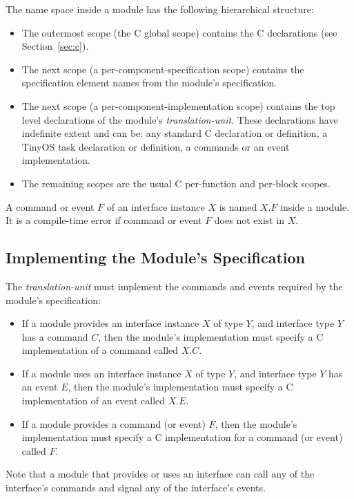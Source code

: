 \documentclass[11pt]{article}
\begin{document}
The name space inside a module has the following hierarchical structure:
\begin{itemize}
\item The outermost scope (the C global scope) contains the C declarations
(see Section~\ref{sec:c}).
\item The next scope (a per-component-specification scope) contains the
specification element names from the module's specification.
\item The next scope (a per-component-implementation scope) contains the
top level declarations of the module's \emph{translation-unit}. These
declarations have indefinite extent and can be: any standard C declaration
or definition, a TinyOS task declaration or definition, a commands or an
event implementation.


\item The remaining scopes are the usual C per-function and per-block scopes.
\end{itemize}

A command or event $F$ of an interface instance $X$ is named $X.F$ inside a
module. It is a compile-time error if command or event $F$ does not 
exist in $X$.

\subsection{Implementing the Module's Specification}

The \emph{translation-unit} must implement the commands and events
required by the module's specification:
\begin{itemize}
\item If a module provides an interface instance $X$ of type $Y$, and
interface type $Y$ has a command $C$, then the module's implementation
must specify a C implementation of a command called $X.C$. 

\item If a module uses an interface instance $X$ of type $Y$, and interface
type $Y$ has an event $E$, then the module's implementation must specify a
C implementation of an event called $X.E$.

\item If a module provides a command (or event) $F$, then the
module's implementation must specify a C implementation for a command (or
event) called $F$.
\end{itemize}

Note that a module that provides or uses an interface can call any of the
interface's commands and signal any of the interface's events.
\end{document}
